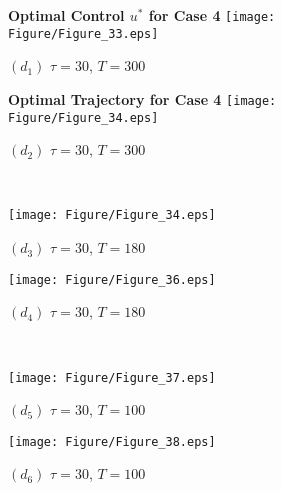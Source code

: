 \documentclass[10pt,letterpaper]{article}
\begin{document}
\begin{figure}[H]
    \centering
    \begin{subfigure}[t]{0.48\textwidth}
        \centering
        \textbf{Optimal Control $u^*$ for Case 4}
        \texttt{[image: Figure/Figure\_33.eps]}
        \par \vspace{1pt} $(d_1)$ $\tau = 30$, $T = 300$
    \end{subfigure}
    \hfill
    \begin{subfigure}[t]{0.48\textwidth}
        \centering
        \textbf{Optimal Trajectory for Case 4}
        \texttt{[image: Figure/Figure\_34.eps]}
        \par \vspace{1pt} $(d_2)$ $\tau = 30$, $T = 300$
    \end{subfigure}
    \\[10pt] %
    
    \begin{subfigure}[t]{0.48\textwidth}
        \centering
        \texttt{[image: Figure/Figure\_34.eps]}
        \par \vspace{1pt} $(d_3)$ $\tau = 30$, $T = 180$
    \end{subfigure}
    \hfill
    \begin{subfigure}[t]{0.48\textwidth}
        \centering
        \texttt{[image: Figure/Figure\_36.eps]}
        \par \vspace{1pt} $(d_4)$ $\tau = 30$, $T = 180$
    \end{subfigure}
    \\[10pt]
    
    \begin{subfigure}[t]{0.48\textwidth}
        \centering
        \texttt{[image: Figure/Figure\_37.eps]}
        \par \vspace{1pt} $(d_5)$ $\tau = 30$, $T = 100$
    \end{subfigure}
    \hfill
    \begin{subfigure}[t]{0.48\textwidth}
        \centering
        \texttt{[image: Figure/Figure\_38.eps]}
        \par \vspace{1pt} $(d_6)$ $\tau = 30$, $T = 100$
    \end{subfigure}
    \\[10pt]
    

\end{figure}
\end{document}
